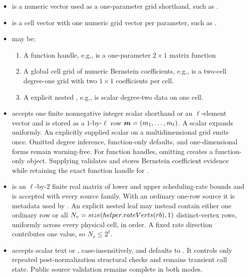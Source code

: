 \arghead
\begin{itemize}[leftmargin=*]
  \item {} is a numeric vector used as a one-parameter grid shorthand, such as \code{[0 1 2]}.
  \item {} is a cell vector with one numeric grid vector per parameter, such as \code{{[0 1], [10 20]}}.
  \item {} may be:
  \begin{enumerate}
      \item A function handle, e.g.,  is a one-parameter $2\times 1$ matrix function
      \item A global cell grid of numeric Bernstein coefficients, e.g., \code{{[1 2], [3 4]}} is a two-cell degree-one grid with two $1\times1$ coefficients per cell.
      \item A explicit nested , e.g.,  is scalar degree-two data on one cell.
  \end{enumerate}
  \item {} accepts one finite nonnegative integer scalar shorthand or an $\ell$-element vector and is stored as a $1$-by-$\ell$ row $\boldsymbol{m}=(m_1,\ldots,m_\ell)$. A scalar expands uniformly. An explicitly supplied scalar on a multidimensional grid emits  once. Omitted degree inference, function-only defaults, and one-dimensional forms remain warning-free. For function handles, omitting  creates a function-only object. Supplying  validates and stores Bernstein coefficient evidence while retaining the exact function handle for .
  \item {} is an $\ell$-by-$2$ finite real matrix of lower and upper scheduling-rate bounds and is accepted with every source family. With an ordinary one-row source it is metadata used by . An explicit nested leaf may instead contain either one ordinary row or all $N_v=size(helper.rateVerts(rb),1)$ distinct-vertex rows, uniformly across every physical cell, in  order. A fixed rate direction contributes one value, so $N_v\le 2^\ell$.
  \item {} accepts scalar text  or , case-insensitively, and defaults to . It controls only repeated post-normalization structural checks and remains transient call state. Public source validation remains complete in both modes.
\end{itemize}

